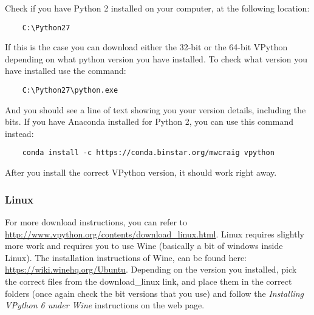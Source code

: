 \documentclass{article}
\begin{document}
Check if you have Python 2 installed on your computer, at the following location:

\begin{verbatim}
    C:\Python27
\end{verbatim}
If this is the case you can download either the 32-bit or the 64-bit VPython depending on what python version you have installed. To check what version you have installed use the command:

\begin{verbatim}
    C:\Python27\python.exe
\end{verbatim}
And you should see a line of text showing you your version details, including the bits. If you have Anaconda installed for Python 2, you can use this command instead:

\begin{verbatim}
    conda install -c https://conda.binstar.org/mwcraig vpython
\end{verbatim}
After you install the correct VPython version, it should work right away.
\subsubsection*{Linux}
For more download instructions, you can refer to \url{http://www.vpython.org/contents/download_linux.html}.
Linux requires slightly more work and requires you to use Wine (basically a bit of windows inside Linux). The installation instructions of Wine, can be found here: \url{https://wiki.winehq.org/Ubuntu}. Depending on the version you installed, pick the correct files from the download\_linux link, and place them in the correct folders (once again check the bit versions that you use) and follow the \emph{Installing VPython 6 under Wine} instructions on the web page.
\end{document}
